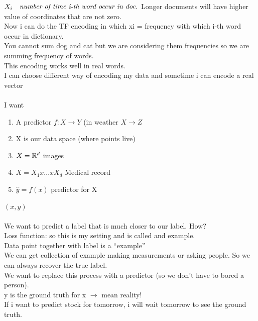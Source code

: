 \documentclass[../main.tex]{subfiles}
\begin{document}
$X_i\quad \textit{number of time i-th word occur in doc.}\\ $
Longer documents will have higher value of coordinates that are not zero.\\
Now i can do the TF encoding in which xi = frequency with which i-th word
occur in dictionary.\\
You cannot sum dog and cat but we are considering them frequencies so we
are summing frequency of words.\\
This encoding works well in real words.\\
I can choose different way of encoding my data and sometime i can encode a
real vector\\\\
I want
\begin{enumerate}
\item A predictor $f: X \longrightarrow Y$ (in weather $X \longrightarrow Z $
\item X is our data space (where points live)
\item $X = \mathbb{R}^d$ images
\item $ X = X_1 x ... x X_d$ Medical record
\item $\hat{y} = f(x) $ predictor for X
\end{enumerate}
$(x,y)$\\\\
We want to predict a label that is much closer to our label. How?\\
Loss function: so this is my setting and is called and example.\\
Data point together with label is a “example”\\
We can get collection of example making measurements or asking people. So
we can always recover the true label.\\
We want to replace this process with a predictor (so we don’t have to bored a
person).\\
y is the ground truth for x $\rightarrow$ mean reality!\\
If i want to predict stock for tomorrow, i will wait tomorrow to see the ground truth.
\end{document}
